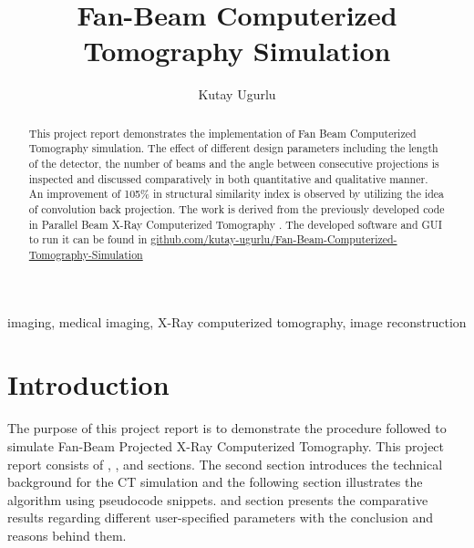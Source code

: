 \documentclass[journal]{IEEEtran}
\title{Fan-Beam Computerized Tomography Simulation}
\author{Kutay Ugurlu}
\begin{document}

\maketitle

\begin{abstract}This project report demonstrates the implementation of Fan Beam Computerized Tomography simulation. The effect of different design parameters including the length of the detector, the number of beams and the angle between consecutive projections is inspected and discussed comparatively in both quantitative and qualitative manner. An improvement of 105\% in structural similarity index is observed by utilizing the idea of convolution back projection. The work is derived from the previously developed code in Parallel Beam X-Ray Computerized Tomography \cite{ugurlu2021}. The developed software and GUI to run it can be found in \href{https://github.com/kutay-ugurlu/Fan-Beam-Computerized-Tomography-Simulation}{github.com/kutay-ugurlu/Fan-Beam-Computerized-Tomography-Simulation} \\
\end{abstract}
\begin{IEEEkeywords}
	imaging, medical imaging, X-Ray computerized tomography, image reconstruction
\end{IEEEkeywords}

\section{Introduction} \label{sec:intro}
The purpose of this project report is to demonstrate the procedure followed to simulate Fan-Beam Projected X-Ray Computerized Tomography. This project report consists of , ,  and  sections. The second section introduces the technical background for the CT simulation and the following section illustrates the algorithm using pseudocode snippets.  and  section presents the comparative results regarding different user-specified parameters with the conclusion and reasons behind them.
\end{document}
